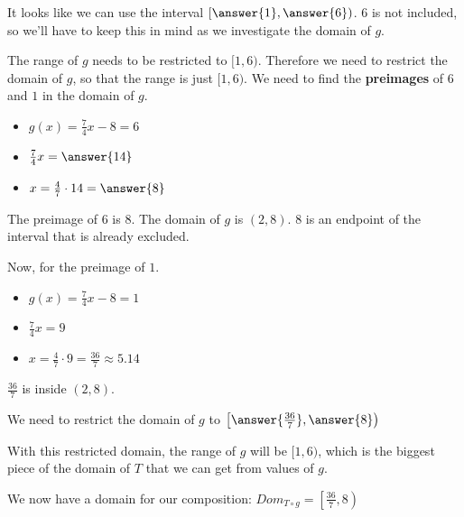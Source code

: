 \documentclass{ximera}
\begin{document}
\begin{explanation}



It looks like we can use the interval $\left[ \answer{1}, \answer{6} \right)$.   $6$ is not included, so we'll have to keep this in mind as we investigate the domain of $g$.


The range of $g$ needs to be restricted to $[1, 6)$.  Therefore we need to restrict the domain of $g$, so that the range is just $[1, 6)$. We need to find the \textbf{preimages} of $6$ and $1$ in the domain of $g$.




\begin{itemize}
\item $g(x) = \frac{7}{4}x-8 = 6$
\item $\frac{7}{4}x = \answer{14}$
\item $x = \frac{4}{7} \cdot 14 = \answer{8}$
\end{itemize}


The preimage of $6$ is $8$.  The domain of $g$ is $(2,8)$. $8$ is an endpoint of the interval that is already excluded.


Now, for the preimage of $1$.

\begin{itemize}
\item $g(x) = \frac{7}{4}x-8 = 1$
\item $\frac{7}{4}x = 9$
\item $x = \frac{4}{7} \cdot 9 = \frac{36}{7} \approx 5.14$
\end{itemize}

$\frac{36}{7}$ is inside $(2,8)$.

We need to restrict the domain of $g$ to $\left[ \answer{\frac{36}{7}}, \answer{8} \right)$


With this restricted domain, the range of $g$ will be $[1, 6)$, which is the biggest piece of the domain of $T$ that we can get from values of $g$.

We now have a domain for our composition: $Dom_{T \circ g} = \left[\frac{36}{7}, 8\right)$

\end{explanation}
\end{document}
